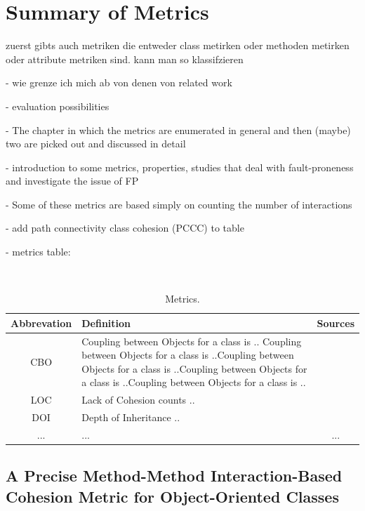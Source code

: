 \section{Summary of Metrics}\label{analysis}

\cite{lanza2002beyond} zuerst gibts auch metriken die entweder class metirken oder methoden metirken oder attribute metriken sind. kann man so klassifzieren

- wie grenze ich mich ab von denen von related work

- evaluation possibilities

- The chapter in which the metrics are enumerated in general and then (maybe) two are picked out and discussed in detail

- introduction to some metrics, properties, studies that deal with fault-proneness and investigate the issue of FP

- Some of these metrics are based simply on counting the number of interactions

- add path connectivity class cohesion (PCCC) to table

- metrics table:

\begin{table}
	\caption{Metrics.}~\label{tab:metrics}
	
	\setlength\tabcolsep{3pt}
	\renewcommand{\arraystretch}{1.4}%
	\begin{tabularx}{\columnwidth}{ | c | p{5.8cm} || c | }
		\hline
		Abbrevation & Definition & Sources \\ \hline\hline
		CBO & Coupling between Objects for a class is .. Coupling between Objects for a class is ..Coupling between Objects for a class is ..Coupling between Objects for a class is ..Coupling between Objects for a class is ..& \cite{b14chidamber1994metrics} \\ \hline
		LOC & Lack of Cohesion counts ..  & \cite{b15chidamber1991towards} \\ \hline
		DOI & Depth of Inheritance .. & \cite{b15chidamber1991towards} \\ \hline
		... & ... & ... \\ \hline
	\end{tabularx}
\end{table}


\subsection{A Precise Method-Method Interaction-Based Cohesion Metric for Object-Oriented Classes}

